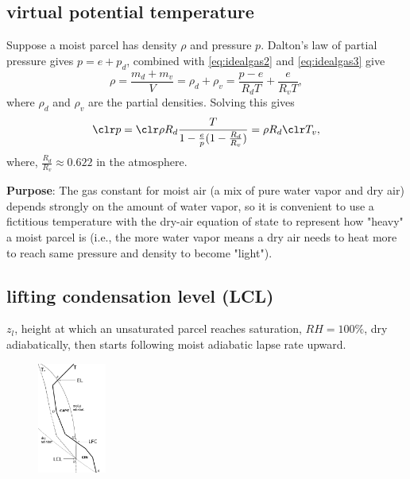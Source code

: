 \subsection{virtual potential temperature}
\begin{defn*}
\end{defn*}



\begin{derv*} Suppose a moist parcel has density $\rho$ and pressure $p$.
Dalton's law of partial pressure gives $p = e + p_d$, combined with \eqref{eq:idealgas2} and
\eqref{eq:idealgas3} give
\begin{equation}
   \rho = \frac{m_d + m_v}{V} = \rho_d + \rho_v = \frac{p-e}{R_dT} + \frac{e}{R_vT}, 
\end{equation}
where $\rho_d$ and $\rho_v$ are the partial densities.
Solving this gives
\begin{equation}
   {\clr p} = {\clr \rho} R_d \frac{T}{1-\frac{e}{p}(1-\frac{R_d}{R_v})} = \rho R_d {\clr T_v},
\end{equation}
where, $\frac{R_d}{R_v} \approx 0.622$ in the atmosphere. \\
\end{derv*}
{\bf Purpose}:
The gas constant for moist air (a mix of pure water vapor and dry air) depends strongly on the
amount of water vapor, so it is convenient to use a fictitious temperature with the dry-air equation
of state to represent how "heavy" a moist parcel is (i.e., the more water vapor means a dry air
needs to heat more to reach same pressure and density to become "light"). \\

\subsection{lifting condensation level (LCL)}
\begin{defn*} $z_l$, height at which an unsaturated parcel reaches saturation, $RH=100\%$, dry
adiabatically, then starts following moist adiabatic lapse rate upward. 
\begin{figure} [H] 
   \includegraphics[width=0.2\textwidth, height=0.3\textwidth]{sounding.png}
   \caption{\label{sounding}}
\end{figure}
\end{defn*}

